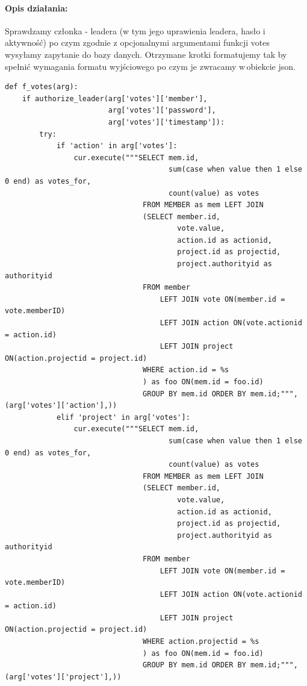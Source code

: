 \documentclass{article}
\begin{document}
\paragraph{Opis działania: }
Sprawdzamy członka - leadera (w tym jego uprawienia leadera, hasło i aktywność) po czym zgodnie z opcjonalnymi argumentami funkcji votes wysyłamy zapytanie do bazy danych.
Otrzymane krotki formatujemy tak by spełnić wymagania formatu wyjściowego po czym je zwracamy w\,obiekcie json. \newline
\begin{verbatim}
def f_votes(arg):
    if authorize_leader(arg['votes']['member'], 
                        arg['votes']['password'], 
                        arg['votes']['timestamp']):
        try:
            if 'action' in arg['votes']:
                cur.execute("""SELECT mem.id,
                                      sum(case when value then 1 else 0 end) as votes_for,
                                      count(value) as votes 
                                FROM MEMBER as mem LEFT JOIN
                                (SELECT member.id,
                                        vote.value,
                                        action.id as actionid, 
                                        project.id as projectid, 
                                        project.authorityid as authorityid
                                FROM member
                                    LEFT JOIN vote ON(member.id = vote.memberID)
                                    LEFT JOIN action ON(vote.actionid = action.id)
                                    LEFT JOIN project ON(action.projectid = project.id)
                                WHERE action.id = %s
                                ) as foo ON(mem.id = foo.id)
                                GROUP BY mem.id ORDER BY mem.id;""", (arg['votes']['action'],))
            elif 'project' in arg['votes']:
                cur.execute("""SELECT mem.id,
                                      sum(case when value then 1 else 0 end) as votes_for,
                                      count(value) as votes 
                                FROM MEMBER as mem LEFT JOIN
                                (SELECT member.id,
                                        vote.value,
                                        action.id as actionid, 
                                        project.id as projectid, 
                                        project.authorityid as authorityid
                                FROM member
                                    LEFT JOIN vote ON(member.id = vote.memberID)
                                    LEFT JOIN action ON(vote.actionid = action.id)
                                    LEFT JOIN project ON(action.projectid = project.id)
                                WHERE action.projectid = %s
                                ) as foo ON(mem.id = foo.id)
                                GROUP BY mem.id ORDER BY mem.id;""", (arg['votes']['project'],))


\end{verbatim}
\end{document}
